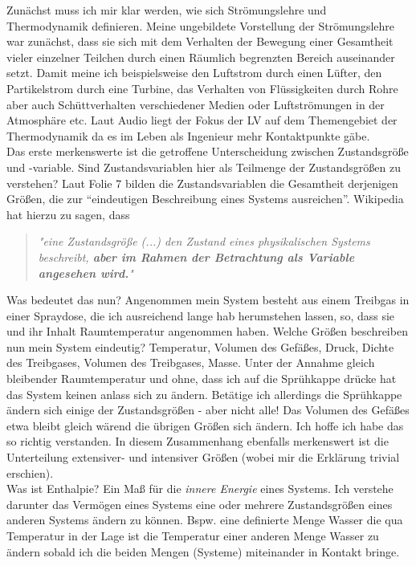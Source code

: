 Zunächst muss ich mir klar werden, wie sich Strömungslehre und Thermodynamik definieren. Meine ungebildete Vorstellung der Strömungslehre war zunächst,
dass sie sich mit dem Verhalten der Bewegung einer Gesamtheit vieler einzelner Teilchen durch einen Räumlich begrenzten Bereich auseinander setzt.
Damit meine ich beispielsweise den Luftstrom durch einen Lüfter, den Partikelstrom durch eine Turbine, das Verhalten von Flüssigkeiten durch Rohre
aber auch Schüttverhalten verschiedener Medien oder Luftströmungen in der Atmosphäre etc.
Laut Audio liegt der Fokus der LV auf dem Themengebiet der Thermodynamik da es im Leben als Ingenieur mehr Kontaktpunkte gäbe.\\

Das erste merkenswerte ist die getroffene Unterscheidung zwischen Zustandsgröße und -variable. Sind Zustandsvariablen hier
als Teilmenge der Zustandsgrößen zu verstehen? Laut Folie 7 bilden die Zustandsvariablen die Gesamtheit derjenigen Größen, die zur "`eindeutigen Beschreibung eines Systems
ausreichen"'. Wikipedia hat hierzu zu sagen, dass
\begin{quote}
    \textit{"}\textit{eine Zustandsgröße (...) den Zustand eines physikalischen Systems beschreibt,
    \textbf{aber im Rahmen der Betrachtung als Variable angesehen wird.}"}
\end{quote}
Was bedeutet das nun? Angenommen mein System besteht aus einem Treibgas in einer Spraydose, die ich ausreichend lange hab herumstehen lassen, so, dass
sie und ihr Inhalt Raumtemperatur angenommen haben. Welche Größen beschreiben nun mein System eindeutig? Temperatur, Volumen des Gefäßes, Druck, Dichte
des Treibgases, Volumen des Treibgases, Masse. Unter der Annahme gleich bleibender Raumtemperatur und ohne, dass ich auf die Sprühkappe drücke
hat das System keinen anlass sich zu ändern. Betätige ich allerdings die Sprühkappe ändern sich einige der Zustandsgrößen - aber nicht alle! Das Volumen
des Gefäßes etwa bleibt gleich wärend die übrigen Größen sich ändern. Ich hoffe ich habe das so richtig verstanden. In diesem Zusammenhang ebenfalls merkenswert
ist die Unterteilung extensiver- und intensiver Größen (wobei mir die Erklärung trivial erschien).\\
Was ist Enthalpie? Ein Maß für die \textit{innere Energie} eines Systems. Ich verstehe darunter das Vermögen eines Systems eine oder mehrere Zustandsgrößen
eines anderen Systems ändern zu können. Bspw. eine definierte Menge Wasser die qua Temperatur in der Lage ist die Temperatur einer anderen Menge Wasser
zu ändern sobald ich die beiden Mengen (Systeme) miteinander in Kontakt bringe.\\

